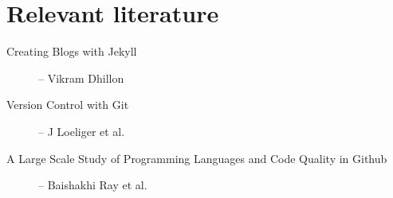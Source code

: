 \documentclass[a4paper,english,11pt]{article}
\begin{document}
\section{Relevant literature}
\begin{description}
\item [Creating Blogs with Jekyll] -- Vikram Dhillon \cite[]{dhillon2016}
\item [Version Control with Git] -- J Loeliger et al. \cite[]{loeliger2012version}
\item [A Large Scale Study of Programming Languages and Code Quality in Github] -- Baishakhi Ray et al. \cite[]{ray2014github}
\end{description}

  
\MakeBibliography[nosplit]
\end{document}

